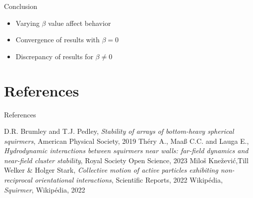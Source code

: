 \documentclass{beamer}
\begin{document}

\begin{frame}{Conclusion}
    \begin{center}
        \begin{itemize}
            \item Varying $\beta$ value affect behavior
            \item Convergence of results with $\beta = 0$
            \item Discrepancy of results for $\beta \ne 0$
        \end{itemize}
    \end{center}
\end{frame}

\section{References}
\begin{frame}{References}
    \begin{thebibliography}{}
         D.R. Brumley and T.J. Pedley, \emph{Stability of arrays of bottom-heavy spherical squirmers}, American Physical Society, 2019
         Théry A., Maaß C.C. and Lauga E., \emph{Hydrodynamic interactions between squirmers near walls: far-field dynamics and near-field cluster stability}, Royal Society Open Science, 2023
         Miloš Knežević,Till Welker \& Holger Stark, \emph{Collective motion of active particles exhibiting non-reciprocal orientational interactions}, Scientific Reports, 2022
         Wikipédia, \emph{Squirmer}, Wikipédia, 2022
    \end{thebibliography}
\end{frame}
\end{document}
